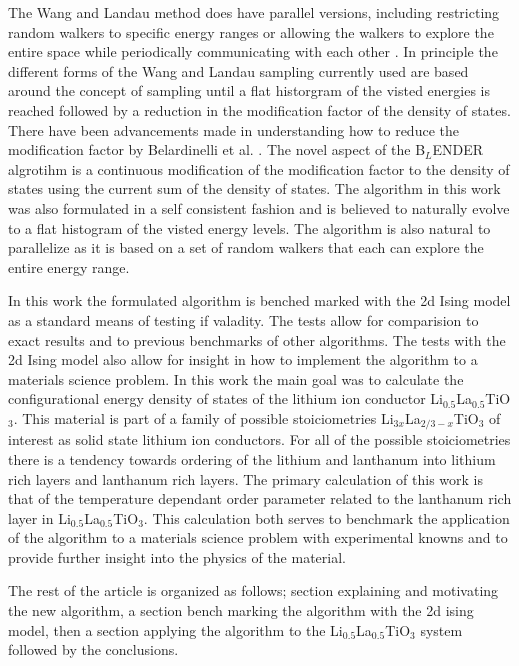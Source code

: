 \documentclass[aps,prl,reprint,superscriptaddress,showkeys]{revtex4-1}
\begin{document}
    The Wang and Landau method does have parallel versions, including  restricting random walkers to specific energy ranges or allowing the walkers to explore the entire space while periodically communicating with each other \cite{MP_Wang_Landau,P_imp_Wang_Landau, Hframe_Wang_Landau}.  In principle the different forms of the Wang and Landau sampling currently used are based around the concept of sampling until a flat historgram of the visted energies is reached followed by a reduction in the modification factor of the density of states. There have been advancements made in understanding how to reduce the modification factor by Belardinelli et al. \cite{saturation}. The novel aspect of the B$_{L}$ENDER algrotihm is a continuous modification of the modification factor to the  density of states using the current sum of the density of states. The algorithm in this work was also formulated in a self consistent fashion and is believed to naturally evolve to a flat histogram of the visted energy levels.  The  algorithm is also natural to parallelize as it is based on a set of random walkers that each can explore the entire energy range. 

   In this work the formulated algorithm is benched marked with the 2d Ising model as a standard means of testing if valadity.  The tests allow for comparision to exact results and to previous benchmarks of other algorithms. The tests with the 2d Ising model also allow for insight in how to implement the algorithm to a materials science problem. In this work the main goal was to calculate the configurational energy density of states of the lithium ion conductor Li$_{0.5}$La$_{0.5}$TiO$_3$.  This material is part of a family of possible stoiciometries Li$_{3x}$La$_{2/3 -x}$TiO$_3$ of interest as solid state lithium ion conductors\cite{domainboundaries,P4mmmstrucuture,imaginary_phonons,GENG2009555,peculiarities,LLTOreview,Li_La_ordering_computational}. For all of the possible stoiciometries there is a tendency towards ordering of the lithium and lanthanum into lithium rich layers and lanthanum rich layers.  The primary calculation of this work is that of the temperature dependant order parameter related to the lanthanum rich layer in Li$_{0.5}$La$_{0.5}$TiO$_3$. This calculation both serves to benchmark the application of the algorithm to a materials science problem with experimental knowns and to provide further insight into the physics of the material. 
   
   The rest of the article is organized as follows;  section explaining and motivating the new algorithm, a section bench marking the algorithm with the 2d ising model, then a section applying the algorithm to the Li$_{0.5}$La$_{0.5}$TiO$_3$ system followed by the conclusions. 
\end{document}
